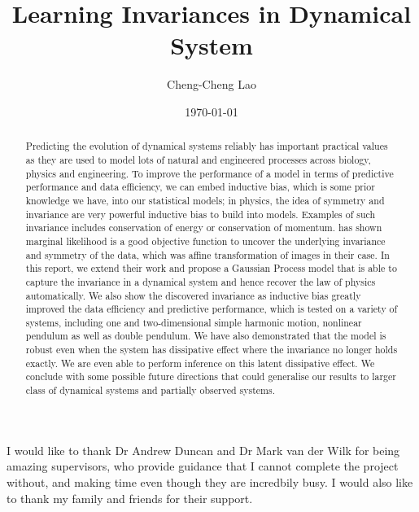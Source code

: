 \documentclass{statsmsc}
\title{Learning Invariances in Dynamical System}
\author{Cheng-Cheng Lao}
\date{\today}
\begin{document}
\maketitle


\declarationdate{\today}
\declaration 


\begin{abstract}
Predicting the evolution of dynamical systems reliably has important practical values as they are used to model lots of natural and engineered processes across biology, physics and engineering.
To improve the performance of a model in terms of predictive performance and data efficiency, we can embed inductive bias, which is some prior knowledge we have, into our statistical models; in physics, the idea of symmetry and invariance are very powerful inductive bias to build into models.
Examples of such invariance includes conservation of energy or conservation of momentum.
\cite{Mark2017} has shown marginal likelihood is a good objective function to uncover the underlying invariance and symmetry of the data, which was affine transformation of images in their case. 
In this report, we extend their work and propose a Gaussian Process model that is able to capture the invariance in a dynamical system and hence recover the law of physics automatically.
We also show the discovered invariance as inductive bias greatly improved the data efficiency and predictive performance, which is tested on a variety of systems, including one and two-dimensional simple harmonic motion, nonlinear pendulum as well as double pendulum.
We have also demonstrated that the model is robust even when the system has dissipative effect where the invariance no longer holds exactly. 
We are even able to perform inference on this latent dissipative effect.
We conclude with some possible future directions that could generalise our results to larger class of dynamical systems and partially observed systems.
\end{abstract}

\begin{acknowledgements}
I would like to thank Dr Andrew Duncan and Dr Mark van der Wilk for being amazing supervisors, who provide guidance that I cannot complete the project without, and making time even though they are incredbily busy. 
I would also like to thank my family and friends for their support.

\end{acknowledgements}
\end{document}
